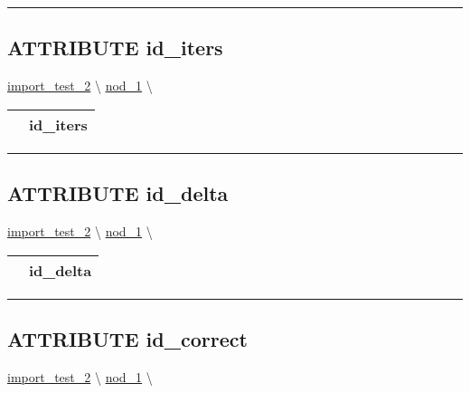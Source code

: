 \rule{\linewidth}{0.5pt}
\subsection*{\textsf{\colorbox{headtoc}{\color{white} ATTRIBUTE}
id\_iters}}

\hypertarget{ecldoc:constants.id_iters}{}
\hspace{0pt} \hyperlink{ecldoc:import_test_2}{import_test_2} \textbackslash 
\hspace{0pt} \hyperlink{ecldoc:Constants}{nod_1} \textbackslash 

{\renewcommand{\arraystretch}{1.5}
\begin{tabularx}{\textwidth}{|>{\raggedright\arraybackslash}l|X|}
\hline
\hspace{0pt}\mytexttt{\color{red} } & \textbf{id\_iters} \\
\hline
\end{tabularx}
}

\par


\rule{\linewidth}{0.5pt}
\subsection*{\textsf{\colorbox{headtoc}{\color{white} ATTRIBUTE}
id\_delta}}

\hypertarget{ecldoc:constants.id_delta}{}
\hspace{0pt} \hyperlink{ecldoc:import_test_2}{import_test_2} \textbackslash 
\hspace{0pt} \hyperlink{ecldoc:Constants}{nod_1} \textbackslash 

{\renewcommand{\arraystretch}{1.5}
\begin{tabularx}{\textwidth}{|>{\raggedright\arraybackslash}l|X|}
\hline
\hspace{0pt}\mytexttt{\color{red} } & \textbf{id\_delta} \\
\hline
\end{tabularx}
}

\par


\rule{\linewidth}{0.5pt}
\subsection*{\textsf{\colorbox{headtoc}{\color{white} ATTRIBUTE}
id\_correct}}

\hypertarget{ecldoc:constants.id_correct}{}
\hspace{0pt} \hyperlink{ecldoc:import_test_2}{import_test_2} \textbackslash 
\hspace{0pt} \hyperlink{ecldoc:Constants}{nod_1} \textbackslash 

